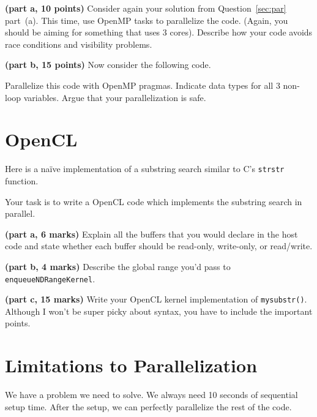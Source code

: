 \documentclass[12pt]{article}
\begin{document}
\noindent
{\bf (part a, 10 points)} Consider again your solution from Question~\ref{sec:par}
part~(a).  This time, use OpenMP tasks to parallelize the
code. (Again, you should be aiming for something that uses 3
cores). Describe how your code avoids race conditions and visibility
problems.

\vspace*{1em}
\noindent
{\bf (part b, 15 points)} Now consider the following code.

Parallelize this code with OpenMP pragmas. Indicate
data types for all 3 non-loop variables. Argue that your parallelization
is safe.


\newpage
\section{OpenCL}

Here is a na\"ive implementation of a substring search
similar to C's {\tt strstr} function.



\vspace*{1em} \noindent
Your task is to write a OpenCL code which implements the substring
search in parallel.

\vspace*{1em} \noindent
{\bf (part a, 6 marks)} Explain all the buffers that you would declare
in the host code and state whether each buffer should be read-only,
write-only, or read/write.

\vspace*{1em} \noindent
{\bf (part b, 4 marks)} Describe the global range you'd pass to 
{\tt enqueueNDRangeKernel}.

\vspace*{1em} \noindent
{\bf (part c, 15 marks)} Write your OpenCL kernel implementation of 
{\tt mysubstr()}. Although I won't be super picky about syntax,
you have to include the important points.


\section{Limitations to Parallelization}

We have a problem we need to solve. We always need 10 seconds
of sequential setup time. After the setup, we can perfectly parallelize
the rest of the code.
\end{document}
